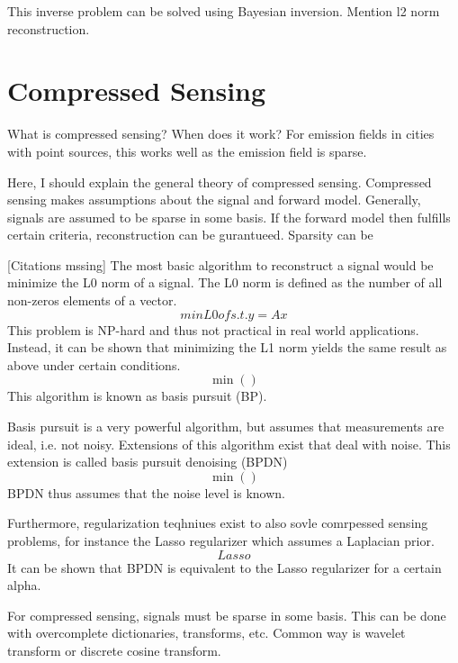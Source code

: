 This inverse problem can be solved using Bayesian inversion.
Mention l2 norm reconstruction.

\section{Compressed Sensing}
What is compressed sensing?
When does it work?
For emission fields in cities with point sources, this works well as the emission field is sparse.

Here, I should explain the general theory of compressed sensing.
Compressed sensing makes assumptions about the signal and forward model.
Generally, signals are assumed to be sparse in some basis.
If the forward model then fulfills certain criteria, reconstruction can be gurantueed.
Sparsity can be 

[Citations mssing]
The most basic algorithm to reconstruct a signal would be minimize the L0 norm of a signal.
The L0 norm is defined as the number of all non-zeros elements of a vector.
\begin{equation}
    min L0 of  s.t. y = Ax
\end{equation}
This problem is NP-hard and thus not practical in real world applications.
Instead, it can be shown that minimizing the L1 norm yields the same result as above under certain conditions.
\begin{equation}
    \min()
\end{equation}
This algorithm is known as basis pursuit (BP).

Basis pursuit is a very powerful algorithm, but assumes that measurements are ideal, i.e. not noisy.
Extensions of this algorithm exist that deal with noise.
This extension is called basis pursuit denoising (BPDN)
\begin{equation}
    \min()
\end{equation}
BPDN thus assumes that the noise level is known.

Furthermore, regularization teqhniues exist to also sovle comrpessed sensing problems, for instance the Lasso regularizer which assumes a Laplacian prior.
\begin{equation}
    Lasso
\end{equation}
It can be shown that BPDN is equivalent to the Lasso regularizer for a certain alpha.

For compressed sensing, signals must be sparse in some basis.
This can be done with overcomplete dictionaries, transforms, etc.
Common way is wavelet transform or discrete cosine transform.

